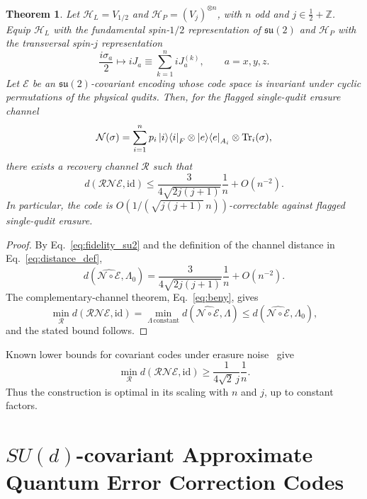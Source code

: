 \documentclass[10pt,twocolumn,superscriptaddress,aps,amsmath,amssymb,citeautoscript,floatfix,prx,longbibliography]{revtex4-2}
\newtheorem{theorem}{Theorem}
\theoremstyle{plain}
\theoremstyle{plain}
\theoremstyle{plain}
\theoremstyle{plain}
\theoremstyle{plain}
\theoremstyle{plain}
\begin{document}
\begin{theorem}\label{thrm:su2scale}
Let $\mathcal H_L=V_{1/2}$ and $\mathcal H_P=(V_j)^{\otimes n}$, with $n$ odd and $j\in\frac12+\mathbb Z$. Equip $\mathcal H_L$ with the fundamental spin-$1/2$ representation of $\mathfrak{su}(2)$ and $\mathcal H_P$ with the transversal spin-$j$ representation
\begin{equation}
    \frac{i\sigma_a}{2}
    \longmapsto
    iJ_a
    \equiv
    \sum_{k=1}^n iJ_a^{(k)},
    \qquad a=x,y,z .
\end{equation}
Let $\mathcal E$ be an $\mathfrak{su}(2)$-covariant encoding whose code space is invariant under cyclic permutations of the physical qudits. Then, for the flagged single-qudit erasure channel
\[
    \mathcal N(\sigma)
    =
    \sum_{i=1}^n p_i\ket i\!\bra i_F
    \otimes \ket e\!\bra e_{A_i}
    \otimes \operatorname{Tr}_i(\sigma),
\]
there exists a recovery channel $\mathcal R$ such that
\[
    d(\mathcal R\mathcal N\mathcal E,\mathrm{id})
    \le
    \frac{3}{4\sqrt{2j(j+1)}}\frac{1}{n}
    +O(n^{-2}) .
\]
In particular, the code is $O\!\left(1/(\sqrt{j(j+1)}\,n)\right)$-correctable against flagged single-qudit erasure.
\end{theorem}

\begin{proof}
By Eq.~\eqref{eq:fidelity_su2} and the definition of the channel distance in Eq.~\eqref{eq:distance_def},
\[
    d\!\left(\widehat{\mathcal N\circ\mathcal E},\Lambda_0\right)
    =
    \frac{3}{4\sqrt{2j(j+1)}}\frac{1}{n}
    +O(n^{-2}) .
\]
The complementary-channel theorem, Eq.~\eqref{eq:beny}, gives
\[
    \min_{\mathcal R}
    d(\mathcal R\mathcal N\mathcal E,\mathrm{id})
    =
    \min_{\Lambda\,\mathrm{constant}}
    d\!\left(\widehat{\mathcal N\circ\mathcal E},\Lambda\right)
    \le
    d\!\left(\widehat{\mathcal N\circ\mathcal E},\Lambda_0\right),
\]
and the stated bound follows.
\end{proof}

Known lower bounds for covariant codes under erasure noise~\cite{Faist2020} give
\[
    \min_{\mathcal R}
    d(\mathcal R\mathcal N\mathcal E,\mathrm{id})
    \ge
    \frac{1}{4\sqrt{2}\,j}\frac{1}{n} .
\]
Thus the construction is optimal in its scaling with $n$ and $j$, up to constant factors.


\section{\texorpdfstring{$SU(d)$}{SU(d)}-covariant Approximate Quantum Error Correction Codes}\label{sec:main_sud}
\end{document}
